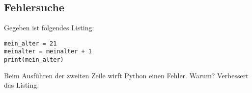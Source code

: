 \subsection{Fehlersuche}
Gegeben ist folgendes Listing:
\begin{lstlisting}
mein_alter = 21
meinalter = meinalter + 1
print(mein_alter)
\end{lstlisting}
Beim Ausführen der zweiten Zeile wirft Python einen Fehler. Warum? Verbessert das Listing.
